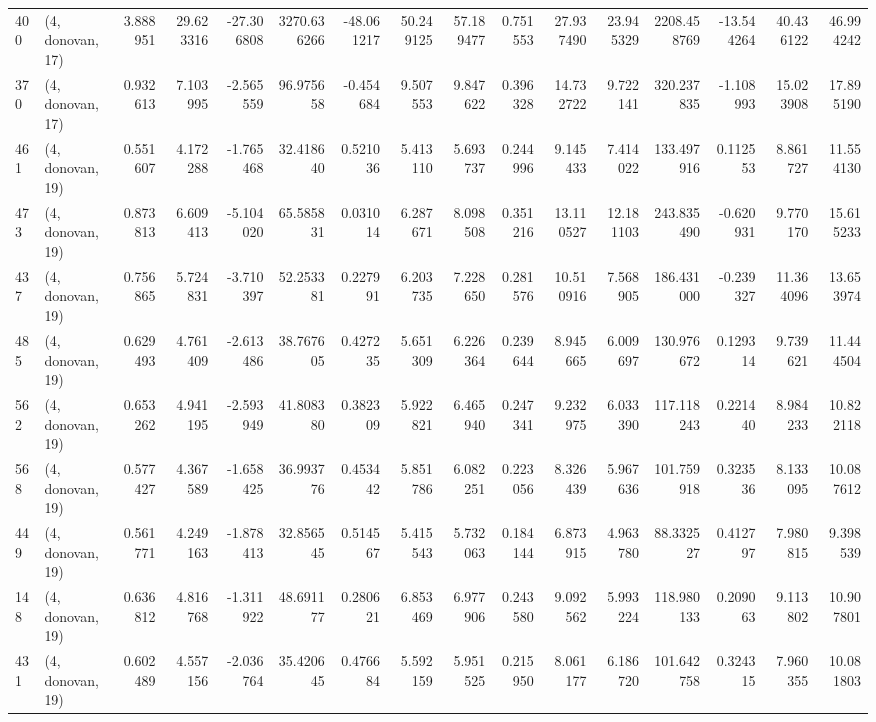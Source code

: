 \begin{tabular}{llrrrrrrrrrrrrrr}
400 &  (4, donovan, 17) &   3.888951 &  29.623316 & -27.306808 &  3270.636266 & -48.061217 &  50.249125 &  57.189477 &  0.751553 &  27.937490 &  23.945329 &   2208.458769 & -13.544264 &   40.436122 &   46.994242 \\
370 &  (4, donovan, 17) &   0.932613 &   7.103995 &  -2.565559 &    96.975658 &  -0.454684 &   9.507553 &   9.847622 &  0.396328 &  14.732722 &   9.722141 &    320.237835 &  -1.108993 &   15.023908 &   17.895190 \\
461 &  (4, donovan, 19) &   0.551607 &   4.172288 &  -1.765468 &    32.418640 &   0.521036 &   5.413110 &   5.693737 &  0.244996 &   9.145433 &   7.414022 &    133.497916 &   0.112553 &    8.861727 &   11.554130 \\
473 &  (4, donovan, 19) &   0.873813 &   6.609413 &  -5.104020 &    65.585831 &   0.031014 &   6.287671 &   8.098508 &  0.351216 &  13.110527 &  12.181103 &    243.835490 &  -0.620931 &    9.770170 &   15.615233 \\
437 &  (4, donovan, 19) &   0.756865 &   5.724831 &  -3.710397 &    52.253381 &   0.227991 &   6.203735 &   7.228650 &  0.281576 &  10.510916 &   7.568905 &    186.431000 &  -0.239327 &   11.364096 &   13.653974 \\
485 &  (4, donovan, 19) &   0.629493 &   4.761409 &  -2.613486 &    38.767605 &   0.427235 &   5.651309 &   6.226364 &  0.239644 &   8.945665 &   6.009697 &    130.976672 &   0.129314 &    9.739621 &   11.444504 \\
562 &  (4, donovan, 19) &   0.653262 &   4.941195 &  -2.593949 &    41.808380 &   0.382309 &   5.922821 &   6.465940 &  0.247341 &   9.232975 &   6.033390 &    117.118243 &   0.221440 &    8.984233 &   10.822118 \\
568 &  (4, donovan, 19) &   0.577427 &   4.367589 &  -1.658425 &    36.993776 &   0.453442 &   5.851786 &   6.082251 &  0.223056 &   8.326439 &   5.967636 &    101.759918 &   0.323536 &    8.133095 &   10.087612 \\
449 &  (4, donovan, 19) &   0.561771 &   4.249163 &  -1.878413 &    32.856545 &   0.514567 &   5.415543 &   5.732063 &  0.184144 &   6.873915 &   4.963780 &     88.332527 &   0.412797 &    7.980815 &    9.398539 \\
148 &  (4, donovan, 19) &   0.636812 &   4.816768 &  -1.311922 &    48.691177 &   0.280621 &   6.853469 &   6.977906 &  0.243580 &   9.092562 &   5.993224 &    118.980133 &   0.209063 &    9.113802 &   10.907801 \\
431 &  (4, donovan, 19) &   0.602489 &   4.557156 &  -2.036764 &    35.420645 &   0.476684 &   5.592159 &   5.951525 &  0.215950 &   8.061177 &   6.186720 &    101.642758 &   0.324315 &    7.960355 &   10.081803 \\

\end{tabular}
